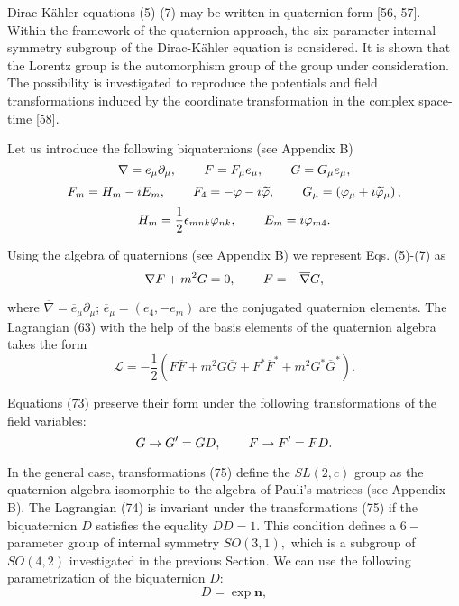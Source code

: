 \documentclass[a4paper,12pt]{article}
\begin{document}
Dirac-K\"ahler equations (5)-(7) may be written in quaternion form [56, 57].
Within the framework of the quaternion approach, the six-parameter
internal-symmetry subgroup of the Dirac-K\"ahler equation is considered. It
is shown that the Lorentz group is the automorphism group of the group under
consideration. The possibility is investigated to reproduce the potentials
and field transformations induced by the coordinate transformation in the
complex space-time [58].

Let us introduce the following biquaternions (see Appendix B)
\[
\nabla =e_\mu \partial _\mu ,\hspace{0.3in}F=F_\mu e_\mu
,\hspace{0.3in} G=G_\mu e_\mu ,
\]
\begin{equation}
F_m=H_m-iE_m,\hspace{0.3in}F_4=-\varphi-i\widetilde{\varphi
},\hspace{0.3in}G_\mu =\left(\varphi_\mu +i\widetilde{\varphi}_\mu
\right), \label{72}
\end{equation}
\[
H_m=\frac 12\epsilon _{mnk}\varphi
_{nk},\hspace{0.3in}E_m=i\varphi _{m4}.
\]

Using the algebra of quaternions (see Appendix B) we represent Eqs. (5)-(7)
as
\begin{equation}
\nabla F+m^2G=0,\hspace{0.3in}F=-\overline{\nabla }G,  \label{73}
\end{equation}

where $\overline{\nabla }=\overline{e}_\mu \partial _\mu $;
$\overline{e} _\mu =(e_4,-e_m)$ are the conjugated quaternion
elements. The Lagrangian (63) with the help of the basis elements
of the quaternion algebra takes the form
\begin{equation}
\mathcal{L}=-\frac 12\left(
F\overline{F}+m^2G\overline{G}+F^{*}\overline{F}
^{*}+m^2G^{*}\overline{G}^{*}\right) .  \label{74}
\end{equation}

Equations (73) preserve their form under the following transformations of
the field variables:
\begin{equation}
G\rightarrow G^{\prime }=GD,\hspace{0.3in}F\rightarrow F^{\prime }=FD.
\label{75}
\end{equation}

In the general case, transformations (75) define the $SL(2,c)$
group as the quaternion algebra isomorphic to the algebra of
Pauli's matrices (see Appendix B). The Lagrangian (74) is
invariant under the transformations (75) if the biquaternion $D$
satisfies the equality $D\overline{D}=1$. This condition defines a
$6-$parameter group of internal symmetry $SO(3,1),$ which is a
subgroup of $SO(4,2)$ investigated in the previous Section. We can
use the following parametrization of the biquaternion $D$:
\begin{equation}
D=\exp \mathbf{n},  \label{76}
\end{equation}
\end{document}

